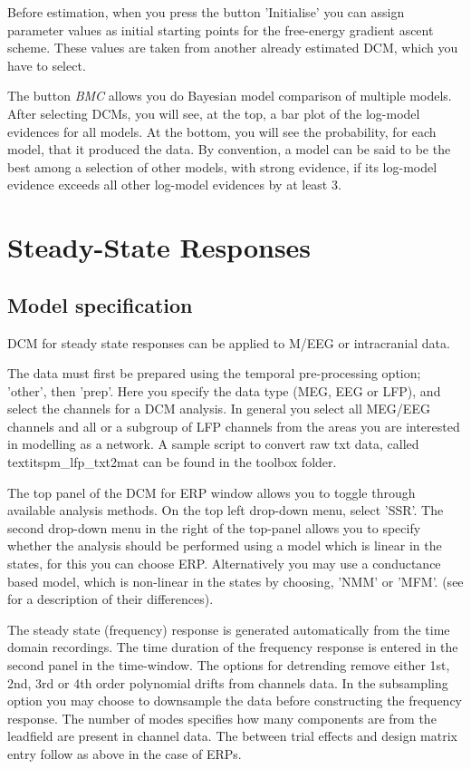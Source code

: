 Before estimation, when you press the button 'Initialise' you can
assign parameter values as initial starting points for the free-energy
gradient ascent scheme. These values are taken from another already
estimated DCM, which you have to select. 

The button \textit{BMC} allows you do Bayesian model comparison of
multiple models. After selecting DCMs, you will see, at the top, a
bar plot of the log-model evidences for all models. At the bottom, you
will see the probability, for each model, that it produced the
data. By convention, a model can be said to be the best among a
selection of other models, with strong evidence, if its log-model
evidence exceeds all other log-model evidences by at least 3. 

\section{Steady-State Responses}

\subsection{Model specification}
DCM for steady state responses can be applied to M/EEG or intracranial data. 

The data must first be prepared using the temporal pre-processing option; 'other', then 'prep'. Here you specify the data type (MEG, EEG or LFP), and select the channels for a DCM analysis. In general you select all MEG/EEG channels and all or a subgroup of LFP channels from the areas you are interested in modelling as a network. A sample script to convert raw txt data, called textit{spm\_lfp\_txt2mat} can be found in the toolbox folder.

The top panel of the DCM for ERP window allows you to toggle through available analysis methods. On the top left drop-down menu, select 'SSR'. The second drop-down menu in the right of the top-panel allows you to specify whether the analysis should be performed using a model which is linear in the states, for this you can choose ERP. Alternatively you may use a conductance based model, which is non-linear in the states by choosing, 'NMM' or 'MFM'. (see \cite{andre_sigmoid} for a description of their differences).
 
The steady state (frequency) response is generated automatically from the time domain recordings. The time duration of the frequency response is entered in the second panel in the time-window.  The options for detrending remove either 1st, 2nd, 3rd or 4th order polynomial drifts from channels data. In the subsampling option you may choose to downsample the data before constructing the frequency response. The number of modes specifies how many components are from the leadfield are present in channel data. The between trial effects and design matrix entry follow as above in the case of ERPs.

